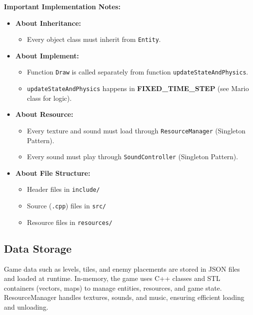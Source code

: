 \begin{flushleft}
\textbf{Important Implementation Notes:}
\begin{itemize}
    \item \textbf{About Inheritance:}
    \begin{itemize}
        \item Every object class must inherit from \texttt{Entity}.
    \end{itemize}
    \item \textbf{About Implement:}
    \begin{itemize}
        \item Function \texttt{Draw} is called separately from function \texttt{updateStateAndPhysics}.
        \item \texttt{updateStateAndPhysics} happens in \textbf{FIXED\_TIME\_STEP} (see Mario class for logic).
    \end{itemize}
    \item \textbf{About Resource:}
    \begin{itemize}
        \item Every texture and sound must load through \texttt{ResourceManager} (Singleton Pattern).
        \item Every sound must play through \texttt{SoundController} (Singleton Pattern).
    \end{itemize}
    \item \textbf{About File Structure:}
    \begin{itemize}
        \item Header files in \texttt{include/}
        \item Source (\texttt{.cpp}) files in \texttt{src/}
        \item Resource files in \texttt{resources/}
    \end{itemize}
\end{itemize}

\begin{flushleft}
\section{Data Storage}
Game data such as levels, tiles, and enemy placements are stored in JSON files and loaded at runtime. In-memory, the game uses C++ classes and STL containers (vectors, maps) to manage entities, resources, and game state. ResourceManager handles textures, sounds, and music, ensuring efficient loading and unloading.


\end{flushleft}
\end{flushleft}
